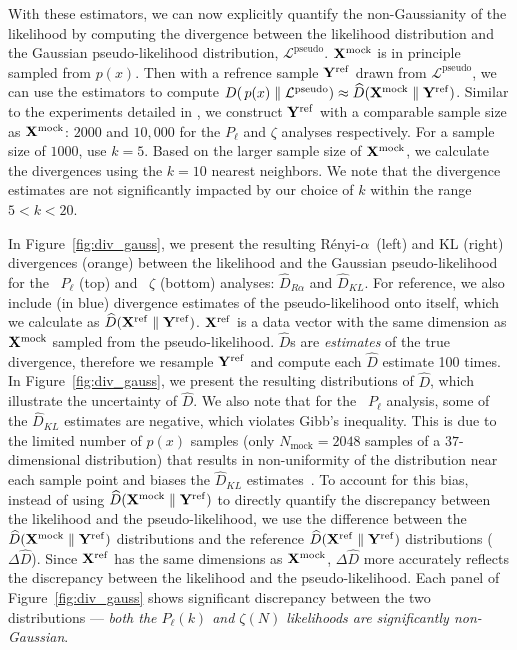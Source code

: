 \documentclass[12pt, letterpaper, preprint]{aastex6}
\newcommand{\Nd}{{100}\xspace}
\newcommand{\Xmock}{{\bf X}^\mathrm{mock}}
\newcommand{\Xref}{{\bf X}^\mathrm{ref}}
\newcommand{\Yref}{{\bf Y}^\mathrm{ref}}
\newcommand{\Ralpha}{R\'enyi-$\alpha$}
\newcommand{\Beut}{\citetalias{beutler2017}\xspace}
\newcommand{\Sinh}{\citetalias{sinha2017}\xspace}
\begin{document}
With these estimators, we can now explicitly quantify the non-Gaussianity of the 
likelihood by computing the divergence between the likelihood distribution and the 
Gaussian pseudo-likelihood distribution, $\mathcal{L}^\mathrm{pseudo}$.
$\Xmock$ is in principle sampled from $p(x)$. Then with a refrence 
sample ${\bf Y}^\mathrm{ref}$ drawn from $\mathcal{L}^\mathrm{pseudo}$, 
we can use the estimators to compute 
$D(\, p(x) \parallel \mathcal{L}^\mathrm{pseudo}) \approx \widehat{D}(\Xmock \parallel {\bf Y}^\mathrm{ref})$. %
Similar to the experiments detailed in \cite{poczos2012},
we construct ${\bf Y}^\mathrm{ref}$ with a comparable sample size as $\Xmock$:
$2000$ and $10,000$ for the $P_\ell$ and $\zeta$ analyses respectively.
For a sample size of $1000$, \cite{sutherland2012} use $k=5$. Based on the 
larger sample size of $\Xmock$, we calculate the divergences using the $k=10$ 
nearest neighbors. We note that the divergence estimates are not significantly 
impacted by our choice of $k$ within the range $5 < k < 20$.

In Figure~\ref{fig:div_gauss}, we present the resulting \Ralpha~(left) 
and KL (right) divergences (orange) between the likelihood and the 
Gaussian pseudo-likelihood for the \Beut~$P_\ell$ (top) and \Sinh~$\zeta$ (bottom) 
analyses: $\widehat{D}_{R\alpha}$ and $\widehat{D}_{KL}$.  For reference, we also 
include (in blue) divergence estimates of the pseudo-likelihood onto itself, 
which we calculate as $\widehat{D}(\Xref \parallel \Yref)$. $\Xref$ is a 
data vector with the same dimension as $\Xmock$ sampled from the pseudo-likelihood. 
$\widehat{D}$s are \emph{estimates} of the true divergence, therefore we 
resample $\Yref$ and compute each $\widehat{D}$ estimate \Nd times. 
In Figure~\ref{fig:div_gauss}, we present the resulting distributions of $\widehat{D}$,
which illustrate the uncertainty of $\widehat{D}$. 
{\color{red} We also note that 
for the \Beut~$P_\ell$ analysis, some of the $\widehat{D}_{KL}$ estimates are negative, 
which violates Gibb's inequality. This is due to the limited number of $p(x)$ samples 
(only $N_\mathrm{mock} = 2048$ samples of a $37$-dimensional distribution) that 
results in non-uniformity of the distribution near each sample point and biases
the $\widehat{D}_{KL}$ estimates~\citep{kraskov2004, wang2009}. To account for this 
bias, instead of using $\widehat{D}(\Xmock \parallel {\bf Y}^\mathrm{ref})$ to 
directly quantify the discrepancy between the likelihood and the pseudo-likelihood,
we use the difference between the $\widehat{D}(\Xmock \parallel {\bf Y}^\mathrm{ref})$ 
distributions and  %
the reference $\widehat{D}(\Xref \parallel \Yref)$ distributions ($\Delta \widehat{D}$).
Since $\Xref$ has the same dimensions as $\Xmock$, $\Delta \widehat{D}$ more accurately
reflects the discrepancy between the likelihood and the pseudo-likelihood.
} 
Each panel of Figure~\ref{fig:div_gauss} shows significant discrepancy between 
the two distributions --- \emph{both the $P_\ell(k)$ and $\zeta(N)$ likelihoods 
are significantly non-Gaussian}. 
\end{document}
